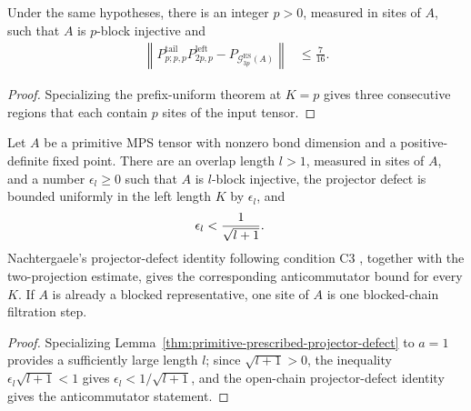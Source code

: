 \begin{lemma}
    \label{thm:three_block_whole_increment_defect_seven_sixteenths}
    \leanok
    Under the same hypotheses, there is an integer $p>0$, measured in sites of
    $A$, such that $A$ is $p$-block injective and
    \begin{align}
        \left\lVert
        P^{\mathrm{tail}}_{p;p,p}P^{\mathrm{left}}_{2p,p}
        -P_{\mathcal G_{3p}^{\mathrm{ES}}(A)}
        \right\rVert
         & \leq \frac{7}{16}.
    \end{align}
\end{lemma}

\begin{proof}
    \leanok
    Specializing the prefix-uniform theorem at $K=p$ gives three consecutive
    regions that each contain $p$ sites of the input tensor.
\end{proof}

\begin{lemma}
    \label{thm:nachtergaele_c3_blocked_length}
    \leanok
    Let $A$ be a primitive MPS tensor with nonzero bond dimension and a
    positive-definite fixed point.  There are an overlap length $l>1$, measured
    in sites of $A$, and a number $\epsilon_l\geq0$ such that $A$ is
    $l$-block injective, the projector defect is bounded
    uniformly in the left length $K$ by $\epsilon_l$, and
    \begin{align}
        \epsilon_l & <\frac{1}{\sqrt{l+1}}.
        \notag
    \end{align}
    Nachtergaele's projector-defect identity following condition C3
    \cite[Eq.~(2.4)]{Nachtergaele1996Spectral}, together with the two-projection
    estimate, gives the corresponding anticommutator bound for every $K$.  If
    $A$ is already a blocked representative, one site of $A$ is one
    blocked-chain filtration step.
\end{lemma}
\begin{proof}
    \leanok
    Specializing Lemma~\ref{thm:primitive-prescribed-projector-defect} to
    $a=1$ provides a sufficiently large length $l$; since $\sqrt{l+1}>0$, the
    inequality $\epsilon_l\sqrt{l+1}<1$ gives $\epsilon_l<1/\sqrt{l+1}$, and
    the open-chain projector-defect identity gives the anticommutator
    statement.
\end{proof}

